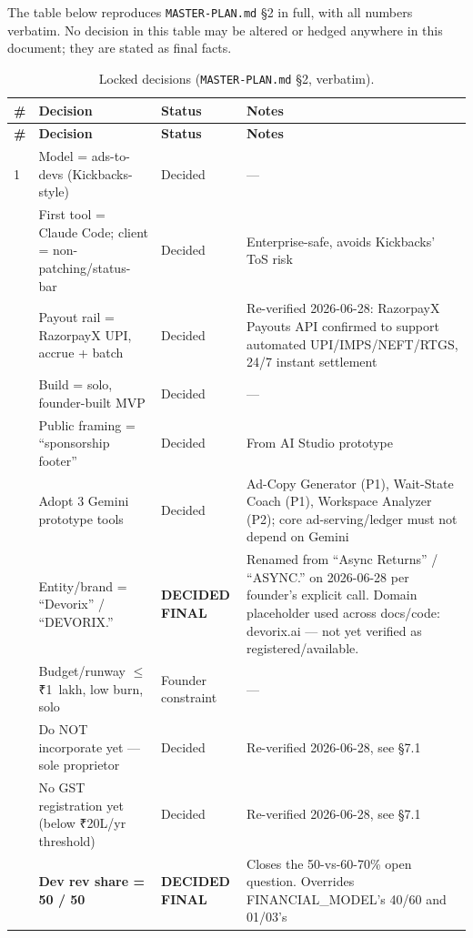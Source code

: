 The table below reproduces \texttt{MASTER-PLAN.md} \S2 in full, with all
numbers verbatim. No decision in this table may be altered or hedged anywhere
in this document; they are stated as final facts.

{\small
\begin{longtable}{p{0.4cm} p{5.1cm} p{2.4cm} p{4.6cm}}
\caption{Locked decisions (\texttt{MASTER-PLAN.md} \S2, verbatim).}
\label{tab:locked-decisions} \\
\toprule
\textbf{\#} & \textbf{Decision} & \textbf{Status} & \textbf{Notes} \\
\midrule
\endfirsthead
\toprule
\textbf{\#} & \textbf{Decision} & \textbf{Status} & \textbf{Notes} \\
\midrule
\endhead
1 & Model = ads-to-devs (Kickbacks-style) & Decided & --- \\
\addlinespace
2 & First tool = Claude Code; client = non-patching/status-bar & Decided &
Enterprise-safe, avoids Kickbacks' ToS risk \\
\addlinespace
3 & Payout rail = RazorpayX UPI, accrue + batch & Decided & Re-verified
2026-06-28: RazorpayX Payouts API confirmed to support automated
UPI/IMPS/NEFT/RTGS, 24/7 instant settlement \\
\addlinespace
4 & Build = solo, founder-built MVP & Decided & --- \\
\addlinespace
5 & Public framing = ``sponsorship footer'' & Decided & From AI Studio
prototype \\
\addlinespace
6 & Adopt 3 Gemini prototype tools & Decided & Ad-Copy Generator (P1),
Wait-State Coach (P1), Workspace Analyzer (P2); core ad-serving/ledger must not
depend on Gemini \\
\addlinespace
7 & Entity/brand = ``Devorix'' / ``DEVORIX.'' & \textbf{DECIDED FINAL} & Renamed
from ``Async Returns'' / ``ASYNC.'' on 2026-06-28 per founder's explicit call.
Domain placeholder used across docs/code: devorix.ai --- not yet verified as
registered/available. \\
\addlinespace
8 & Budget/runway $\leq$ ₹1~lakh, low burn, solo & Founder constraint &
--- \\
\addlinespace
9 & Do NOT incorporate yet --- sole proprietor & Decided & Re-verified
2026-06-28, see \S7.1 \\
\addlinespace
10 & No GST registration yet (below ₹20L/yr threshold) & Decided &
Re-verified 2026-06-28, see \S7.1 \\
\addlinespace
11 & \textbf{Dev rev share = 50 / 50} & \textbf{DECIDED FINAL} & Closes the
50-vs-60-70\% open question. Overrides FINANCIAL\_MODEL's 40/60 and 01/03's

\end{longtable}}
